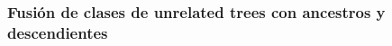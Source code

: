\begin{comment}
    Al pedo esta figura, igual que la anterior
    
\begin{figure}[H]
    \centering
    \begin{tikzpicture}[scale=.65, transform shape, 
    unrelated/.style={circle, draw=red},
    ancestor/.style={circle, draw=blue},
    wiggly/.style={decorate, decoration={snake, amplitude=.2mm, segment length=2mm}}  %
    ]

        \node[ancestor] (a1) at (0, 0) {$a_1$};
        \node[unrelated] (u1) at (-1, -2) {$u_1$};
        \node[ancestor] (a2) at (1, -2) {$a_2$};

        \drawUnrelatedTree{u2}{-1}{-4}{$u_2$}
        \node[unrelated] (u3) at (3, -4) {$u_3$};

        \drawUnrelatedTree{u4}{0}{-7}{$u_4$}
        \node[ancestor] (a4) at (3, -6) {$a_3$};

        \node[nodo] (xi) at (3, -8) {$x_i$};

        \drawUnrelatedTree{r1}{6}{0}{$u_5$} 
        \drawUnrelatedTree{r2}{10}{0}{$u_6$} 
        
        \node[draw=none, fill=none] (hi) at (3, -10) {};


         \path [->] (a1) edge[arista]  (u1);
         \path [->] (a1) edge[arista]  (a2);

         \path [->] (a2) edge[arista]  (u2);
         \path [->] (a2) edge[arista]  (u3);

         \path [->] (a2) edge[arista]  (u4);
         \path [->] (a2) edge[arista]  (a4);

         \path [->] (a4) edge[arista]  (xi);      
         \path [->, teal] (xi) edge[arista,  decorate, decoration={snake, amplitude=.4mm, segment length=4mm, post length=1mm}] node[right] {descendants of $x_i$} (hi);
    \end{tikzpicture}
    \caption{En este caso, los nodos que unificaríamos con esta optimización son $u5$ y $u6$ pues ambos son raíces, y $u2$ y $u4$ pues comparten un padre.}
    \label{fig:equivClass_optimization_example}
\end{figure}

\end{comment}

\subsubsection{Fusión de clases de unrelated trees con ancestros y descendientes}

